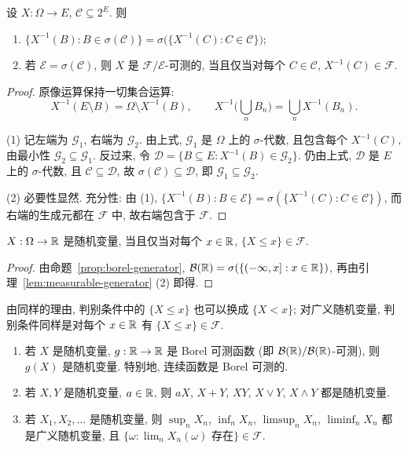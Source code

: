 \begin{lemma}\label{lem:measurable-generator}
设 $X:\Omega\to E$, $\mathcal{C}\subseteq2^E$. 则
\begin{enumerate}
\item $\{X^{-1}(B): B\in\sigma(\mathcal{C})\}=\sigma\big(\{X^{-1}(C): C\in\mathcal{C}\}\big)$;
\item 若 $\mathcal{E}=\sigma(\mathcal{C})$, 则 $X$ 是 $\mathcal{F}/\mathcal{E}$-可测的, 当且仅当对每个 $C\in\mathcal{C}$, $X^{-1}(C)\in\mathcal{F}$.
\end{enumerate}
\end{lemma}

\begin{proof}
原像运算保持一切集合运算:
\[
X^{-1}(E\setminus B)=\Omega\setminus X^{-1}(B),\qquad X^{-1}\Big(\bigcup_n B_n\Big)=\bigcup_n X^{-1}(B_n).
\]

(1) 记左端为 $\mathcal{G}_1$, 右端为 $\mathcal{G}_2$. 由上式, $\mathcal{G}_1$ 是 $\Omega$ 上的 $\sigma$-代数, 且包含每个 $X^{-1}(C)$, 由最小性 $\mathcal{G}_2\subseteq\mathcal{G}_1$. 反过来, 令 $\mathcal{D}=\{B\subseteq E: X^{-1}(B)\in\mathcal{G}_2\}$. 仍由上式, $\mathcal{D}$ 是 $E$ 上的 $\sigma$-代数, 且 $\mathcal{C}\subseteq\mathcal{D}$, 故 $\sigma(\mathcal{C})\subseteq\mathcal{D}$, 即 $\mathcal{G}_1\subseteq\mathcal{G}_2$.

(2) 必要性显然. 充分性: 由 (1), $\{X^{-1}(B): B\in\mathcal{E}\}=\sigma(\{X^{-1}(C):C\in\mathcal{C}\})$, 而右端的生成元都在 $\mathcal{F}$ 中, 故右端包含于 $\mathcal{F}$.
\end{proof}

\begin{corollary}\label{cor:rv-criterion}
$X:\Omega\to\mathbb{R}$ 是随机变量, 当且仅当对每个 $x\in\mathbb{R}$, $\{X\le x\}\in\mathcal{F}$.
\end{corollary}

\begin{proof}
由命题~\ref{prop:borel-generator}, $\mathcal{B}(\mathbb{R})=\sigma(\{(-\infty,x]: x\in\mathbb{R}\})$, 再由引理~\ref{lem:measurable-generator} (2) 即得.
\end{proof}

由同样的理由, 判别条件中的 $\{X\le x\}$ 也可以换成 $\{X<x\}$; 对广义随机变量, 判别条件同样是对每个 $x\in\mathbb{R}$ 有 $\{X\le x\}\in\mathcal{F}$.

\begin{proposition}[随机变量的运算]\label{prop:rv-operations}
\begin{enumerate}
\item 若 $X$ 是随机变量, $g:\mathbb{R}\to\mathbb{R}$ 是 Borel 可测函数 (即 $\mathcal{B}(\mathbb{R})/\mathcal{B}(\mathbb{R})$-可测), 则 $g(X)$ 是随机变量. 特别地, 连续函数是 Borel 可测的.
\item 若 $X,Y$ 是随机变量, $a\in\mathbb{R}$, 则 $aX$, $X+Y$, $XY$, $X\vee Y$, $X\wedge Y$ 都是随机变量.
\item 若 $X_1,X_2,\dots$ 是随机变量, 则 $\sup_n X_n$, $\inf_n X_n$, $\limsup_n X_n$, $\liminf_n X_n$ 都是广义随机变量, 且 $\{\omega: \lim_n X_n(\omega)\text{ 存在}\}\in\mathcal{F}$.
\end{enumerate}
\end{proposition}

